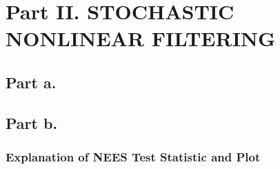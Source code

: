 \documentclass[paper=a4, fontsize=11pt]{scrartcl} %
\numberwithin{equation}{section} %
\numberwithin{figure}{section} %
\numberwithin{table}{section} %
\begin{document}
\section{Part II. STOCHASTIC NONLINEAR FILTERING}
\begin{framed}

\subsection{Part a.}

\subsection{Part b.}
\subsubsection{Explanation of NEES Test Statistic and Plot}


\end{framed}
\end{document}
